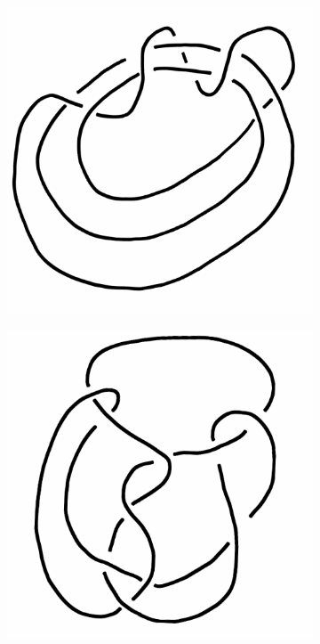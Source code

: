 \documentclass[12pt]{amsart}
\begin{document}
\begin{figure}[h!]
\begin{subfigure}[b]{0.2\textwidth}
\includegraphics[width=\textwidth]{images/perko10-161.png}
\end{subfigure}\qquad
\begin{subfigure}[b]{0.2\textwidth}
\includegraphics[width=\textwidth]{images/perko10-162.png}

\end{subfigure}
\end{figure}
\end{document}
